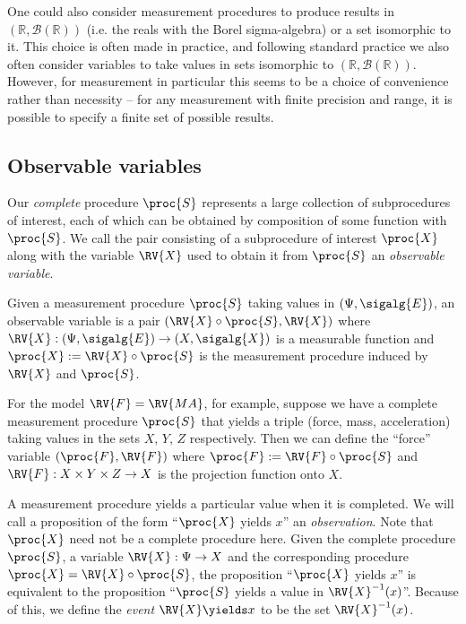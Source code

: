 One could also consider measurement procedures to produce results in $(\mathbb{R},\mathcal{B}(\mathbb{R}))$ (i.e. the reals with the Borel sigma-algebra) or a set isomorphic to it. This choice is often made in practice, and following standard practice we also often consider variables to take values in sets isomorphic to $(\mathbb{R},\mathcal{B}(\mathbb{R}))$. However, for measurement in particular this seems to be a choice of convenience rather than necessity -- for any measurement with finite precision and range, it is possible to specify a finite set of possible results.

\subsection{Observable variables}

Our \emph{complete} procedure $\proc{S}$ represents a large collection of subprocedures of interest, each of which can be obtained by composition of some function with $\proc{S}$. We call the pair consisting of a subprocedure of interest $\proc{X}$ along with the variable $\RV{X}$ used to obtain it from $\proc{S}$ an \emph{observable variable}.

\begin{definition}
Given a measurement procedure $\proc{S}$ taking values in $(\Psi,\sigalg{E})$, an observable variable is a pair $(\RV{X}\circ \proc{S},\RV{X})$ where $\RV{X}:(\Psi,\sigalg{E})\to (X,\sigalg{X})$ is a measurable function and $\proc{X}:=\RV{X}\circ \proc{S}$ is the measurement procedure induced by $\RV{X}$ and $\proc{S}$.
\end{definition}

For the model $\RV{F}=\RV{MA}$, for example, suppose we have a complete measurement procedure $\proc{S}$ that yields a triple (force, mass, acceleration) taking values in the sets $X$, $Y$, $Z$ respectively. Then we can define the ``force'' variable $(\proc{F},\RV{F})$ where $\proc{F}:=\RV{F}\circ \proc{S}$ and $\RV{F}:X\times Y\times Z\to X$ is the projection function onto $X$.

A measurement procedure yields a particular value when it is completed. We will call a proposition of the form ``$\proc{X}$ yields $x$'' an \emph{observation}. Note that $\proc{X}$ need not be a complete procedure here. Given the complete procedure $\proc{S}$, a variable $\RV{X}:\Psi\to X$ and the corresponding procedure $\proc{X}=\RV{X}\circ\proc{S}$, the proposition ``$\proc{X}$ yields $x$'' is equivalent to the proposition ``$\proc{S}$ yields a value in $\RV{X}^{-1}(x)$''. Because of this, we define the \emph{event} $\RV{X}\yields x$ to be the set $\RV{X}^{-1}(x)$.

